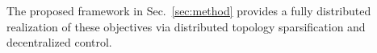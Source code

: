 \documentclass[conference]{IEEEconf}
\newcommand{\Ni}{\mathcal{N}}        %
\theoremstyle{plain}
\begin{document}
The proposed framework in Sec.~\ref{sec:method} provides a fully distributed realization of these objectives via distributed topology sparsification and decentralized control.






\end{document}
